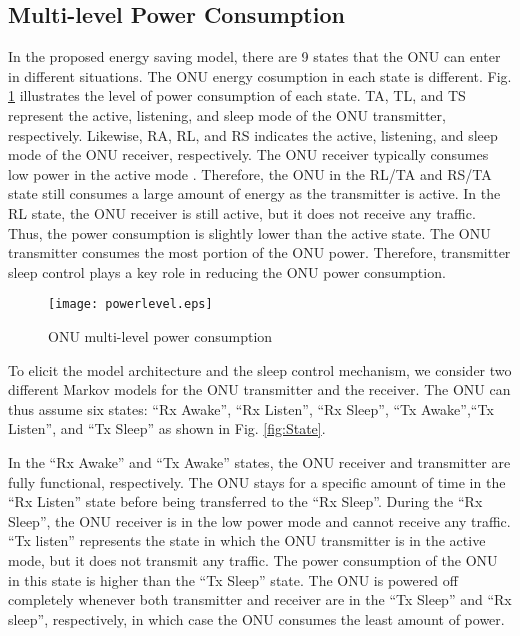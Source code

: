 \documentclass[11pt,english,12pt,onecolumn, draftcls]{IEEEtran}
\theoremstyle{plain}
\theoremstyle{definition}
\begin{document}
\subsection{Multi-level Power Consumption}
In the proposed energy saving model, there are 9 states that the ONU can enter in different situations. The ONU energy cosumption in each state is different. Fig. \ref{fig:Plevel} illustrates the level of power consumption of each state. TA, TL, and TS represent the active, listening, and sleep mode of the ONU transmitter, respectively. Likewise, RA, RL, and RS indicates the active, listening, and sleep mode of the ONU receiver, respectively. The ONU receiver typically consumes low power in the active mode \cite{Wongslp09}. Therefore, the ONU in the RL/TA and RS/TA state still consumes a large amount of energy as the transmitter is active. In the RL state, the ONU receiver is still active, but it does not receive any traffic. Thus, the power consumption is slightly lower than the active state. The ONU transmitter consumes the most portion of the ONU power. Therefore, transmitter sleep control plays a key role in reducing the ONU power consumption. 



\begin{figure}
\centering
\texttt{[image: powerlevel.eps]}
\caption{ONU multi-level power consumption}
\label{fig:Plevel}
\vspace{-.2in}
\end{figure}


To elicit the model architecture and the sleep control mechanism, we consider two different Markov models for the ONU transmitter and the receiver. The ONU can thus assume  six states: ``Rx Awake'', ``Rx Listen'', ``Rx Sleep'', ``Tx Awake'',``Tx Listen'', and ``Tx Sleep''  as shown in Fig. \ref{fig:State}.


In the ``Rx Awake'' and ``Tx Awake'' states, the ONU receiver and transmitter are fully functional, respectively. The ONU stays for a specific amount of time in the ``Rx Listen'' state before being transferred to the ``Rx Sleep''. During the ``Rx Sleep'', the ONU receiver is in the low power mode and cannot receive any traffic. 
``Tx listen'' represents the state in which the ONU transmitter is in the active mode, but it does not transmit any traffic. The power consumption of the ONU in this state is higher than the ``Tx Sleep'' state. The ONU is powered off completely whenever both transmitter and receiver are in the ``Tx Sleep'' and ``Rx sleep'', respectively, in which case the ONU consumes the least amount of power.
\end{document}

